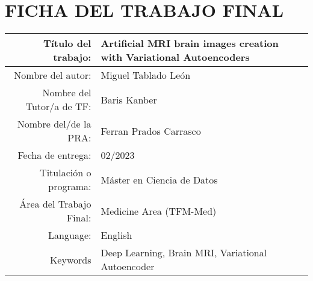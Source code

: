 \documentclass[11pt,a4paper,openany]{book}
\begin{document}




\setcounter{page}{1} 
\pagestyle{plain}

\chapter*{FICHA DEL TRABAJO FINAL}
\begin{table}[ht]
	\centering{}
	\renewcommand{\arraystretch}{2}
	\begin{tabular}{r | l}
		\hline
		Título del trabajo: & Artificial MRI brain images creation with Variational Autoencoders\\
		\hline
        Nombre del autor: & Miguel Tablado León\\
		\hline
        Nombre del Tutor/a de TF: & Baris Kanber\\
		\hline
        Nombre del/de la PRA: & Ferran Prados Carrasco\\
		\hline
        Fecha de entrega: & 02/2023\\
		\hline
        Titulación o programa: & Máster en Ciencia de Datos\\
		\hline
        Área del Trabajo Final: & Medicine Area (TFM-Med)\\
		\hline
        Language: & English\\
		\hline
        Keywords & Deep Learning, Brain MRI, Variational Autoencoder\\
		\hline
	\end{tabular}
\end{table}

\pagestyle{fancy}
\renewcommand{\chaptermark}[1]{ \markboth{#1}{}}
\renewcommand{\sectionmark}[1]{\markright{ \thesection.\ #1}}
\lhead[\fancyplain{}{\bfseries\thepage}]{\fancyplain{}{\bfseries\rightmark}}
\rhead[\fancyplain{}{\bfseries\leftmark}]{\fancyplain{}{\bfseries\thepage}}
\cfoot{}

\cleardoublepage
{}
{}
\tableofcontents
\cleardoublepage
{}
{}
\listoffigures
\cleardoublepage
{}
{}
\listoftables

\thispagestyle{empty}


\pagestyle{fancy}
\renewcommand{\chaptermark}[1]{ \markboth{#1}{}}
\renewcommand{\sectionmark}[1]{\markright{ \thesection.\ #1}}
\lhead[\fancyplain{}{\bfseries\thepage}]{\fancyplain{}{\bfseries\rightmark}}
\rhead[\fancyplain{}{\bfseries\leftmark}]{\fancyplain{}{\bfseries\thepage}}
\cfoot{}
\end{document}
